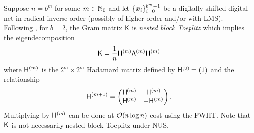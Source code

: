 \documentclass[acmsmall]{acmart}
\begin{document}
Suppose $n =b^m$ for some $m \in {\mathbb{N}}_0$ and let $\{{\boldsymbol{x}}_i\}_{i=0}^{b^m-1}$ be a digitally-shifted digital net in radical inverse order (possibly of higher order and/or with LMS). Following \cite[Theorem 5.3.1,Theorem 5.3.2]{rathinavel.bayesian_QMC_sobol}, for $b=2$, the Gram matrix ${\mathsf{K}}$ is \emph{nested block Toeplitz} which implies the eigendecomposition
$${\mathsf{K}} = \frac{1}{n} {\mathsf{H}}^{(m)} {\mathsf{\Lambda}}^{(m)} {\mathsf{H}}^{(m)}$$ where ${\mathsf{H}}^{(m)}$ is the $2^m \times 2^m$ Hadamard matrix defined by ${\mathsf{H}}^{(0)} = (1)$ and the relationship 
$${\mathsf{H}}^{(m+1)} = \begin{pmatrix} {\mathsf{H}}^{(m)} & {\mathsf{H}}^{(m)} \\ {\mathsf{H}}^{(m)} & - {\mathsf{H}}^{(m)} \end{pmatrix}.$$
Multiplying by ${\mathsf{H}}^{(m)}$ can be done at ${\mathcal{O}}(n \log n)$ cost using the FWHT. 
Note that ${\mathsf{K}}$ is not necessarily nested block Toeplitz under NUS. %
\end{document}
